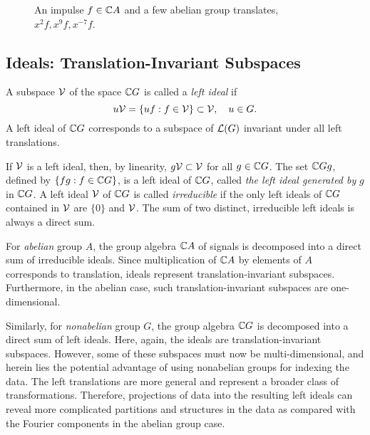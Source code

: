 \begin{figure}
\centerline{}
  \caption{An impulse $f\in \mathbb{C} A$ and a few abelian group translates, $x^2f, x^9f,
      x^{-7}f$.}
  \label{fig:cyclicshift}
\end{figure}


\subsection{Ideals: Translation-Invariant Subspaces}
A subspace $\mathcal{V}$ of the space $\mathbb{C} G$ is called a
\emph{left ideal} if 
\begin{equation}
u\mathcal{V} = \{uf : f \in \mathcal{V}\} \subset \mathcal{V}, \quad u \in G. 
\end{equation}
A left ideal of $\mathbb{C} G$ corresponds to a subspace of $\mathcal{L}(G)$
invariant under all left translations.  

If $\mathcal{V}$ is a left ideal, then, by linearity, 
$g\mathcal{V} \subset \mathcal{V}$ for all $g \in \mathbb{C} G$.
The set $\mathbb{C} G g$, defined by 
$\{fg : f \in \mathbb{C} G\}$, is a left ideal of $\mathbb{C} G$,
called \emph{the left ideal generated by} $g$ in $\mathbb{C} G$. 
A left ideal $\mathcal{V}$ of $\mathbb{C} G$ is called \emph{irreducible}
if the only left ideals of $\mathbb{C} G$ contained in $\mathcal{V}$ are
$\{0\}$ and $\mathcal{V}$. The sum of two distinct, irreducible
left ideals is always a direct sum. 

For \emph{abelian} group $A$, the group algebra $\mathbb{C} A$ of
signals is decomposed into a direct sum of irreducible ideals.  
Since multiplication of $\mathbb{C} A$ by elements of $A$
corresponds to translation, ideals represent
translation-invariant subspaces.  Furthermore, in the 
abelian case, such translation-invariant subspaces are
one-dimensional.   

Similarly, for \emph{nonabelian} group $G$, the group algebra
$\mathbb{C} G$ is decomposed into a direct sum of left ideals. Here,
again, the ideals are translation-invariant 
subspaces.  However, some of these subspaces must now be
multi-dimensional, and herein lies the potential advantage
of using nonabelian groups for indexing the data. The left
translations are more general and represent a broader class of 
transformations. Therefore, projections of data into the
resulting left ideals can reveal more complicated partitions
and structures in the data as compared with the Fourier
components in the abelian group case. 
